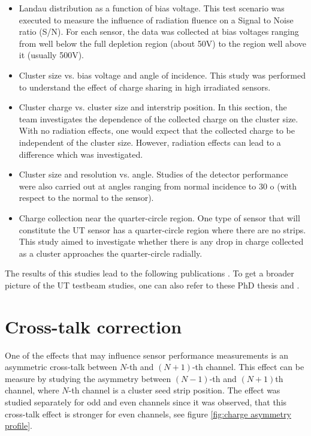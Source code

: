 \begin{itemize}
\item Landau distribution as a function of bias voltage. This test scenario was executed to measure the influence of radiation fluence on a Signal to Noise ratio (S/N).  For each sensor, the data was collected at bias voltages ranging from well below the full depletion region (about 50V) to the region well above it (usually 500V).
\item  Cluster size vs. bias voltage and angle of incidence. This study was performed to understand the effect of charge sharing in high irradiated sensors. 
\item Cluster charge vs. cluster size and interstrip position. In this section, the team investigates the dependence of the collected charge on the cluster size. With no radiation effects, one would expect that the collected charge to be independent of the cluster size. However, radiation effects can lead to a difference which was investigated. 
\item Cluster size and resolution vs. angle.  Studies of the detector performance were also carried out at angles ranging from normal incidence to 30 o (with respect to the normal to the sensor). 
\item Charge collection near the quarter-circle region. One type of sensor that will constitute the UT sensor has a quarter-circle region where there are no strips. This study aimed to investigate whether there is any drop in charge collected as a cluster approaches the quarter-circle radially. 
\end{itemize}

The results of this studies lead to the following publications \cite{tb1} \cite{tb2} \cite{tb3}. To get a broader picture of the UT testbeam studies, one can also refer to these PhD thesis \cite{Federica} and \cite{Kelsey}.


\section{Cross-talk correction}
\label{sec:cross_talk}
One of the effects that may influence sensor performance measurements is an asymmetric cross-talk between $N$-th and $(N+1)$-th channel. This effect can be measure by studying the asymmetry between $(N-1)$-th and $(N+1)$th channel, where $N$-th channel is a cluster seed strip position. The effect was studied separately for odd and even channels since it was observed, that this cross-talk effect is stronger for even channels, see figure \ref{fig:charge asymmetry profile}.  


